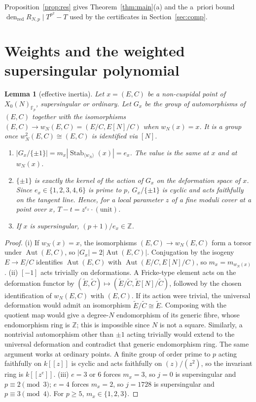 \documentclass[11pt,a4paper]{article}
\numberwithin{equation}{section}
\newtheorem{lemma}[theorem]{Lemma}
\theoremstyle{definition}
\theoremstyle{remark}
\newcommand{\Fb}{\overline{\mathbb F}_p}
\newcommand{\Z}{\mathbb Z}
\newcommand{\Aut}{\operatorname{Aut}}
\newcommand{\Stab}{\operatorname{Stab}}
\newcommand{\den}{\operatorname{den}_{\mathrm{red}}}
\begin{document}
Proposition~\ref{prop:res} gives Theorem~\ref{thm:main}(a) and the a~priori bound
$\den R_{N,p}\mid T^{p^2}-T$ used by the certificates in Section~\ref{sec:comp}.

\section{Weights and the weighted supersingular polynomial}\label{sec:weights}

\begin{lemma}[effective inertia]\label{lem:inertia}
Let $x=(E,C)$ be a non-cuspidal point of $X_0(N)_{\Fb}$, supersingular or ordinary. Let $G_x$ be the group of automorphisms
of $(E,C)$ together with the isomorphisms $(E,C)\to w_N(E,C)=(E/C,E[N]/C)$ when $w_N(x)=x$. It is a group once
$w_N^2(E,C)\cong(E,C)$ is identified via $[N]$.
\begin{enumerate}[label=\textup{(\roman*)}]
\item $|G_x/\{\pm1\}|=m_x|\Stab_{\langle w_N\rangle}(x)|=e_x$. The value is the same at $x$ and at $w_N(x)$.
\item $\{\pm1\}$ is exactly the kernel of the action of $G_x$ on the deformation space of $x$. Since
$e_x\in\{1,2,3,4,6\}$ is prime to $p$, $G_x/\{\pm1\}$ is cyclic and acts faithfully on the tangent line.
Hence, for a local parameter $z$ of a fine moduli cover at a point over $x$, $T-t=z^{e_x}\cdot(\text{unit})$.
\item If $x$ is supersingular, $(p+1)/e_x\in\Z$.
\end{enumerate}
\end{lemma}
\begin{proof}
(i) If $w_N(x)=x$, the isomorphisms $(E,C)\to w_N(E,C)$ form a torsor under $\Aut(E,C)$, so
$|G_x|=2|\Aut(E,C)|$. Conjugation by the isogeny $E\to E/C$ identifies $\Aut(E,C)$ with
$\Aut(E/C,E[N]/C)$, so $m_x=m_{w_N(x)}$.
(ii) $[-1]$ acts trivially on deformations. A Fricke-type element acts
on the deformation functor by
$(\widetilde E,\widetilde C)\mapsto
(\widetilde E/\widetilde C,\widetilde E[N]/\widetilde C)$,
followed by the chosen identification of $w_N(E,C)$ with $(E,C)$.
If its action were trivial, the universal deformation would admit an
isomorphism $\widetilde E/\widetilde C\cong\widetilde E$.
Composing with the quotient map would give a degree-$N$ endomorphism
of its generic fibre, whose endomorphism ring is $\Z$; this is impossible
since $N$ is not a square. Similarly, a nontrivial automorphism other
than $\pm1$ acting trivially would extend to the universal deformation
and contradict that generic endomorphism ring. The same argument works at ordinary points. A finite group of order prime to $p$ acting faithfully on $k[[z]]$ is cyclic and
acts faithfully on $(z)/(z^2)$, so the invariant ring is $k[[z^{e}]]$.
(iii) $e=3$ or $6$ forces $m_x=3$, so $j=0$ is supersingular and $p\equiv2\pmod3$; $e=4$ forces
$m_x=2$, so $j=1728$ is supersingular and $p\equiv3\pmod4$. For $p\ge5$, $m_x\in\{1,2,3\}$.
\end{proof}
\end{document}
